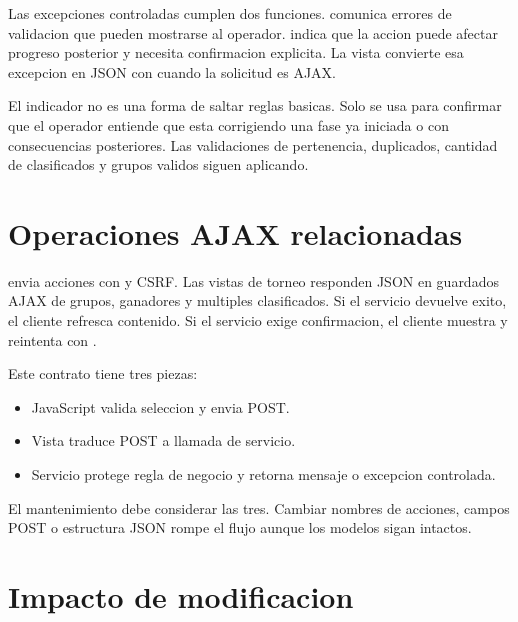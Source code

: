 Las excepciones controladas cumplen dos funciones.  comunica errores de validacion que pueden mostrarse al operador.  indica que la accion puede afectar progreso posterior y necesita confirmacion explicita. La vista convierte esa excepcion en JSON con  cuando la solicitud es AJAX.

El indicador  no es una forma de saltar reglas basicas. Solo se usa para confirmar que el operador entiende que esta corrigiendo una fase ya iniciada o con consecuencias posteriores. Las validaciones de pertenencia, duplicados, cantidad de clasificados y grupos validos siguen aplicando.

\section{Operaciones AJAX relacionadas}
\label{sec:servicios-ajax}

 envia acciones con  y CSRF. Las vistas de torneo responden JSON en guardados AJAX de grupos, ganadores y multiples clasificados. Si el servicio devuelve exito, el cliente refresca contenido. Si el servicio exige confirmacion, el cliente muestra  y reintenta con .

Este contrato tiene tres piezas:

\begin{itemize}
  \item JavaScript valida seleccion y envia POST.
  \item Vista traduce POST a llamada de servicio.
  \item Servicio protege regla de negocio y retorna mensaje o excepcion controlada.
\end{itemize}

El mantenimiento debe considerar las tres. Cambiar nombres de acciones, campos POST o estructura JSON rompe el flujo aunque los modelos sigan intactos.

\section{Impacto de modificacion}
\label{sec:servicios-impacto-modificacion}

